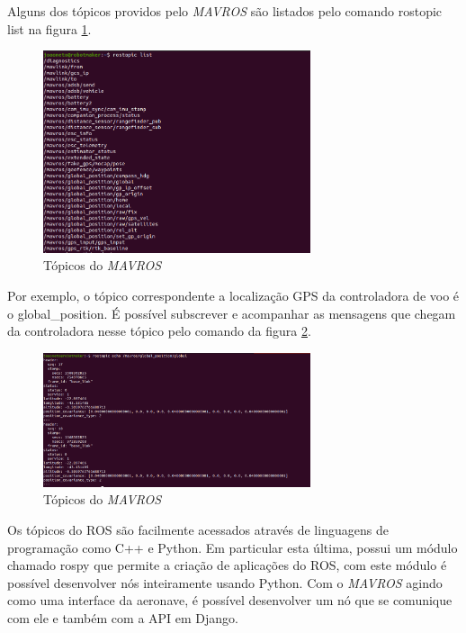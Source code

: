 \documentclass[12pt,a4paper,oneside]{book}
\begin{document}
%
Alguns dos tópicos providos pelo \textit{MAVROS} são listados pelo comando rostopic list na figura \ref{fig:mavros_rostopic_list.png.0}. 
%
\begin{figure}[H]
  \centering
  \includegraphics[width=0.7\textwidth]{Images/Desenvolvimento/mavros_rostopic_list.png}
  \caption{Tópicos do \textit{MAVROS}}
  \label{fig:mavros_rostopic_list.png.0}
\end{figure}
%
Por exemplo, o tópico correspondente a localização GPS da controladora de voo é o global\_position. É possível subscrever e acompanhar as mensagens que chegam da controladora nesse tópico pelo comando da figura \ref{fig:mavros_rostopic_echo.png.0}.
%
\begin{figure}[H]
  \centering
  \includegraphics[width=0.7\textwidth]{Images/Desenvolvimento/mavros_rostopic_echo.png}
  \caption{Tópicos do \textit{MAVROS}}
  \label{fig:mavros_rostopic_echo.png.0}
\end{figure}
%

Os tópicos do ROS são facilmente acessados através de linguagens de programação como C++ e Python. Em particular esta última, possui um módulo chamado rospy que permite a criação de aplicações do ROS, com este módulo é possível desenvolver nós inteiramente usando Python. Com o \textit{MAVROS} agindo como uma interface da aeronave, é possível desenvolver um nó que se comunique com ele e também com a API em Django.
\end{document}
